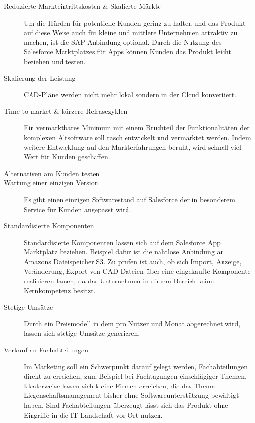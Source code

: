 \begin{description}
	\item[Reduzierte Markteintrittskosten \& Skalierte Märkte] Um die 
Hürden für potentielle Kunden gering zu halten und das Produkt auf diese Weise 
auch für kleine und mittlere Unternehmen attraktiv zu machen, ist die 
SAP-Anbindung optional. Durch die Nutzung des Salesforce Marktplatzes für Apps 
können Kunden das Produkt leicht beziehen und testen.
	\item[Skalierung der Leistung] CAD-Pläne werden nicht mehr lokal 
sondern in der Cloud konvertiert.
	\item[Time to market \& kürzere Releasezyklen] Ein vermarktbares 
Minimum mit einem Bruchteil der Funktionalitäten der komplexen Altsoftware soll 
rasch entwickelt und vermarktet werden. Indem weitere Entwicklung auf den 
Markterfahrungen beruht, wird schnell viel Wert für Kunden geschaffen.
	\item[Alternativen am Kunden testen] 
	\item[Wartung einer einzigen Version] Es gibt einen einzigen 
Softwarestand auf Salesforce der in besonderem Service für Kunden angepasst 
wird. 
	\item[Standardisierte Komponenten] Standardisierte Komponenten lassen 
sich auf dem Salesforce App Marktplatz beziehen. Beispiel dafür ist die 
nahtlose Anbindung an Amazons Dateispeicher S3. Zu prüfen ist auch, ob sich 
Import, Anzeige, Veränderung, Export von CAD Dateien über eine eingekaufte 
Komponente realisieren lassen, da das Unternehmen in diesem Bereich keine 
Kernkompetenz besitzt.
	\item[Stetige Umsätze] Durch ein Preismodell in dem pro Nutzer und 
Monat abgerechnet wird, lassen sich stetige Umsätze generieren.
	\item[Verkauf an Fachabteilungen] Im Marketing soll ein Schwerpunkt 
darauf gelegt werden, Fachabteilungen direkt zu erreichen, zum Beispiel bei 
Fachtagungen einschlägiger Themen. Idealerweise lassen sich kleine Firmen 
erreichen, die das Thema Liegenschaftsmanagement bisher ohne 
Softwareunterstützung bewältigt haben. Sind Fachabteilungen überzeugt lässt 
sich das Produkt ohne Eingriffe in die IT-Landschaft vor Ort nutzen.
\end{description}

